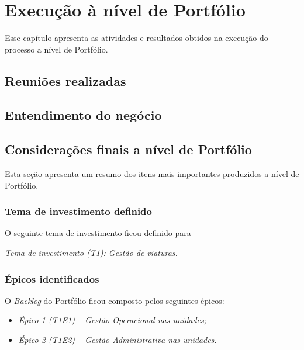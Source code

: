 \chapter{Execução à nível de Portfólio}
  
  Esse capítulo apresenta as atividades e resultados obtidos na execução do processo a nível de Portfólio.
  
  \section{Reuniões realizadas}
  
  
  \section{Entendimento do negócio}
  
    
  
  \section{Considerações finais a nível de Portfólio}
    
    Esta seção apresenta um resumo dos itens mais importantes produzidos a nível de Portfólio.
    
    \subsection{Tema de investimento definido}
      
      O seguinte tema de investimento ficou definido para 
      
      \emph{Tema de investimento (T1): Gestão de viaturas.}
    
    \subsection{Épicos identificados}
      
      O \textit{Backlog} do Portfólio ficou composto pelos seguintes épicos:
      
      \begin{itemize}
      \item \emph{Épico 1 (T1E1) – Gestão Operacional nas unidades;}
      \item \emph{Épico 2 (T1E2) – Gestão Administrativa nas unidades.}
      \end{itemize}

    